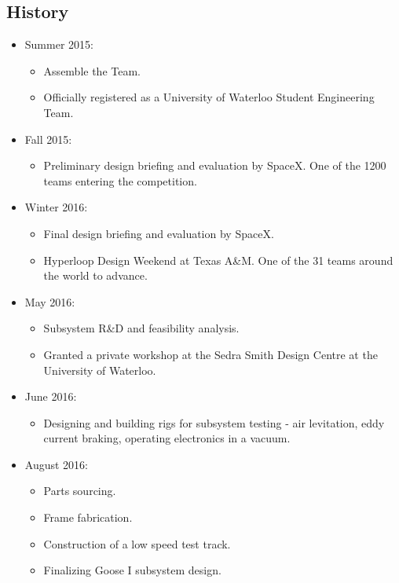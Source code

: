 \documentclass[main.tex]{subfiles}
\begin{document}
\begin{flushleft}
\section{History}
\begin{itemize}

\item Summer 2015:
\begin{itemize}
    \item Assemble the Team.
    \item Officially registered as a University of Waterloo Student Engineering Team.
\end{itemize}

\item Fall 2015:
\begin{itemize}
    \item Preliminary design briefing and evaluation by SpaceX. One of the 1200 teams entering the competition.
\end{itemize}

\item Winter 2016:
\begin{itemize}
    \item Final design briefing and evaluation by SpaceX.
    \item Hyperloop Design Weekend at Texas A\&M. One of the 31 teams around the world to advance.
\end{itemize}

\item May 2016:
\begin{itemize}
    \item Subsystem R\&D and feasibility analysis.
    \item Granted a private workshop at the Sedra Smith Design Centre at the University of Waterloo.
\end{itemize}

\item June 2016:
\begin{itemize}
    \item Designing and building rigs for subsystem testing - air levitation, eddy current braking, operating electronics in a vacuum.
\end{itemize}

\item August 2016:
\begin{itemize}
    \item Parts sourcing.
    \item Frame fabrication.
    \item Construction of a low speed test track.
    \item Finalizing Goose I subsystem design.
\end{itemize}


\end{itemize}
\end{flushleft}
\end{document}
